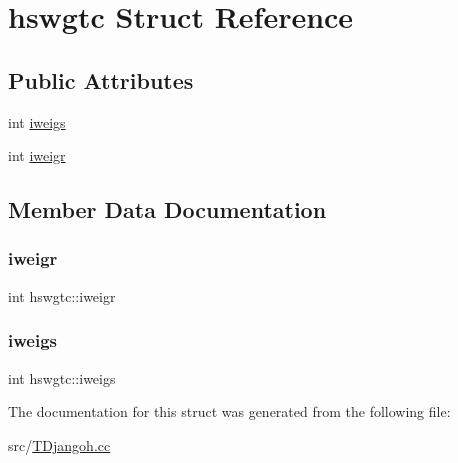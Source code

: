 \hypertarget{structhswgtc}{}\section{hswgtc Struct Reference}
\label{structhswgtc}
\subsection*{Public Attributes}
\begin{DoxyCompactItemize}
\item 
int \hyperlink{structhswgtc_a7607a6d6bcb4ec3df6ca4254579ad03c}{iweigs}
\item 
int \hyperlink{structhswgtc_ae78f065043089b27354699eddcc1b98e}{iweigr}
\end{DoxyCompactItemize}


\subsection{Member Data Documentation}
\mbox{\label{structhswgtc_ae78f065043089b27354699eddcc1b98e}} 
\subsubsection{\texorpdfstring{iweigr}{iweigr}}
{\footnotesize\ttfamily int hswgtc\+::iweigr}

\mbox{\label{structhswgtc_a7607a6d6bcb4ec3df6ca4254579ad03c}} 
\subsubsection{\texorpdfstring{iweigs}{iweigs}}
{\footnotesize\ttfamily int hswgtc\+::iweigs}



The documentation for this struct was generated from the following file\+:\begin{DoxyCompactItemize}
\item 
src/\hyperlink{_t_djangoh_8cc}{T\+Djangoh.\+cc}\end{DoxyCompactItemize}
